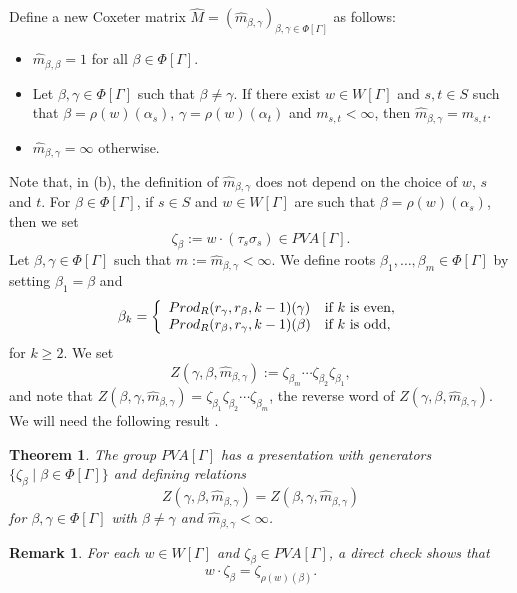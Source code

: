 \documentclass[12pt]{amsart}
\newtheorem{theorem}[equation]{Theorem}
\newtheorem{remark}[equation]{Remark}
\numberwithin{equation}{section}
\begin{document}
Define a new Coxeter matrix $\widehat M=(\widehat m_{\beta,\gamma})_{\beta,\gamma\in\Phi[\Gamma]}$ as follows:
\begin{itemize}
\item[(a)] $\widehat m_{\beta,\beta}=1$ for all $\beta\in\Phi[\Gamma]$.
\item[(b)] Let $\beta,\gamma\in\Phi[\Gamma]$ such that $\beta\neq\gamma$. If there exist $w\in W[\Gamma]$ and $s,t\in S$ such that $\beta= \rho(w)(\alpha_s)$, $\gamma=\rho(w)(\alpha_t)$ and $m_{s,t}<\infty$, then $\widehat m_{\beta,\gamma}=m_{s,t}$.
\item[(c)]  $\widehat m_{\beta,\gamma}=\infty$ otherwise.
\end{itemize}
Note that, in (b),  the definition of $\widehat m_{\beta,\gamma}$ does not depend on the choice of $w$, $s$ and $t$. For $\beta\in\Phi[\Gamma]$, if $s\in S$ and $w\in W[\Gamma]$ are such that $\beta=\rho(w)(\alpha_s)$, then we set $$\zeta_\beta :=w\cdot(\tau_s\sigma_s)\in PVA[\Gamma].$$ Let $\beta,\gamma\in\Phi[\Gamma]$ such that $m:=\widehat m_{\beta,\gamma}<\infty$. We define roots $\beta_1,\dots,\beta_m\in\Phi[\Gamma]$ by setting $\beta_1=\beta$ and
$$
\beta_k=\left\{\begin{array}{ll}
{\rm Prod}_R(r_\gamma,r_\beta,k-1)(\gamma)&\text{if}~k~\text{is even},\\
{\rm Prod}_R(r_\beta,r_\gamma,k-1)(\beta)&\text{if}~k~\text{is odd},
\end{array}\right.
$$
for $k\ge2$. We set 
\begin{equation}\label{eq:relPVA}
Z(\gamma,\beta,\widehat m_{\beta,\gamma}) :=\zeta_{\beta_m}\cdots\zeta_{\beta_2}\zeta_{\beta_1},
\end{equation}
and note that $Z(\beta,\gamma,\widehat m_{\beta,\gamma})=\zeta_{\beta_1}\zeta_{\beta_2}\cdots\zeta_{\beta_m}$, the reverse word of $Z(\gamma,\beta,\widehat m_{\beta,\gamma})$. We will need the following result  \cite[Theorem 2.6]{MR4753773}.

\begin{theorem}\label{prop:presentationpva}
The group $PVA[\Gamma]$ has a presentation with generators $\{ \zeta_\beta  \mid \beta\in\Phi[\Gamma] \}$ and defining relations
$$
Z(\gamma,\beta,\widehat m_{\beta,\gamma})=Z(\beta,\gamma,\widehat m_{\beta,\gamma})
$$
for $\beta,\gamma\in\Phi[\Gamma]$ with $\beta\neq\gamma$ and $\widehat m_{\beta,\gamma}<\infty$.
\end{theorem}

\begin{remark}\label{rmk:action}
For each $w\in W[\Gamma]$ and $\zeta_\beta\in PVA[\Gamma]$, a direct check shows that  $$w\cdot \zeta_\beta=\zeta_{\rho(w)(\beta)}.$$
\end{remark}
\medskip
\end{document}
